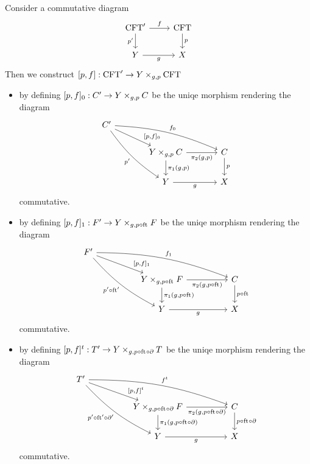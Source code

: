 \begin{defn}\label{cobesys-existence}
Consider a commutative diagram
\begin{equation*}
\begin{tikzcd}
\stesys'
  \ar{r}{f}
  \ar{d}[swap]{p'}
  &
\stesys
  \ar{d}{p}
  \\
Y \ar{r}[swap]{g}
  &
X
\end{tikzcd}
\end{equation*}
Then we construct $[p,f]:\stesys'\to\cobesys{Y}{\stesys}{g}{p}$
\begin{itemize}
\item by defining $[p,f]_0:\stesysc'\to\pullback{Y}{\stesysc}{g}{p}$ be the uniqe
morphism rendering the diagram
\begin{equation*}
\begin{tikzcd}[column sep=large]
\stesysc'
  \ar[bend right=10]{ddr}[swap]{p'}
  \ar[bend left=10]{rrd}{f_0}
  \ar{dr}[near end]{[p,f]_0}
  \\
  {}&
\pullback{Y}{\stesysc}{g}{p}
  \ar{r}[swap]{\pullbackpr{2}{g}{p}}
  \ar{d}{\pullbackpr{1}{g}{p}}
  &
\stesysc
  \ar{d}{p}
  \\
  {}&
Y \ar{r}[swap]{g}
  &
X
\end{tikzcd}
\end{equation*}
commutative.
\item by defining $[p,f]_1:\stesysf'\to\pullback{Y}{\stesysf}{g}{p\circ\eft}$ be the uniqe
morphism rendering the diagram
\begin{equation*}
\begin{tikzcd}[column sep=huge]
\stesysf'
  \ar[bend right=10]{ddr}[swap]{p'\circ\eft'}
  \ar[bend left=10]{rrd}{f_1}
  \ar{dr}[near end]{[p,f]_1}
  \\
  {}&
\pullback{Y}{\stesysf}{g}{p\circ\eft}
  \ar{r}[swap]{\pullbackpr{2}{g}{p\circ\eft}}
  \ar{d}{\pullbackpr{1}{g}{p\circ\eft}}
  &
\stesysc
  \ar{d}{p\circ\eft}
  \\
  {}&
Y \ar{r}[swap]{g}
  &
X
\end{tikzcd}
\end{equation*}
commutative.
\item by defining $[p,f]^t:\stesyst'\to\pullback{Y}{\stesyst}{g}{p\circ\eft\circ\ebd}$ be the uniqe
morphism rendering the diagram
\begin{equation*}
\begin{tikzcd}[column sep=huge]
\stesyst'
  \ar[bend right=10]{ddr}[swap]{p'\circ\eft'\circ\ebd'}
  \ar[bend left=10]{rrd}{f^t}
  \ar{dr}[near end]{[p,f]^t}
  \\
  {}&
\pullback{Y}{\stesysf}{g}{p\circ\eft\circ\ebd}
  \ar{r}[swap]{\pullbackpr{2}{g}{p\circ\eft\circ\ebd}}
  \ar{d}{\pullbackpr{1}{g}{p\circ\eft\circ\ebd}}
  &
\stesysc
  \ar{d}{p\circ\eft\circ\ebd}
  \\
  {}&
Y \ar{r}[swap]{g}
  &
X
\end{tikzcd}
\end{equation*}
commutative.
\end{itemize}
\end{defn}

